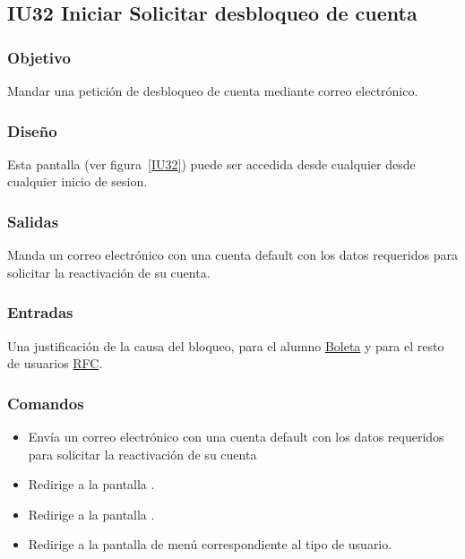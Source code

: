 
\subsection{IU32 Iniciar Solicitar desbloqueo de cuenta}

\subsubsection{Objetivo}
    Mandar una petición de desbloqueo de cuenta mediante correo electrónico.

\subsubsection{Diseño}
	Esta pantalla  (ver figura~\ref{IU32}) puede ser accedida desde cualquier desde cualquier inicio de sesion.



\subsubsection{Salidas}

    Manda un correo electrónico con una cuenta default con los datos requeridos para solicitar la reactivación de su cuenta.

\subsubsection{Entradas}
    Una justificación de la causa del bloqueo, para el alumno \hyperlink{Alumno.Boleta}{Boleta} y para el resto de usuarios \hyperlink{Empleado.RFC}{RFC}.


\subsubsection{Comandos}
\begin{itemize}

    \item {} Envía un correo electrónico con una cuenta default con los datos requeridos para solicitar la reactivación de su cuenta
    \item {} Redirige a la pantalla .
    \item {} Redirige a la pantalla .
    \item {} Redirige a la pantalla de menú correspondiente al tipo de usuario.
	
\end{itemize}

